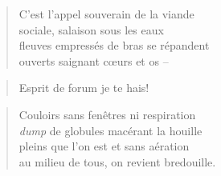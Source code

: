 


    	





  \begin{verse}
    C’est l’appel souverain de la viande\\
    sociale, salaison sous les eaux\\
    fleuves empressés de bras se répandent\\
    ouverts saignant cœurs et os --
  \end{verse}
  \begin{verse}
    Esprit de forum je te hais!
  \end{verse}
  \begin{verse}
    Couloirs sans fenêtres ni respiration\\
    \textit{dump} de globules macérant la houille\\
    pleins que l’on est et sans aération\\
    au milieu de tous, on revient bredouille.
  \end{verse}


